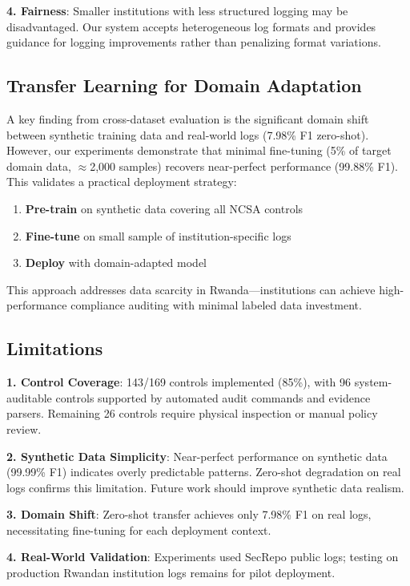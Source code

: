 \documentclass[11pt,conference]{IEEEtran}
\begin{document}
\textbf{4. Fairness}: Smaller institutions with less structured logging may be disadvantaged. Our system accepts heterogeneous log formats and provides guidance for logging improvements rather than penalizing format variations.

\subsection{Transfer Learning for Domain Adaptation}

A key finding from cross-dataset evaluation is the significant domain shift between synthetic training data and real-world logs (7.98\% F1 zero-shot). However, our experiments demonstrate that minimal fine-tuning (5\% of target domain data, $\approx$2,000 samples) recovers near-perfect performance (99.88\% F1). This validates a practical deployment strategy:

\begin{enumerate}
    \item \textbf{Pre-train} on synthetic data covering all NCSA controls
    \item \textbf{Fine-tune} on small sample of institution-specific logs
    \item \textbf{Deploy} with domain-adapted model
\end{enumerate}

This approach addresses data scarcity in Rwanda---institutions can achieve high-performance compliance auditing with minimal labeled data investment.

\subsection{Limitations}

\textbf{1. Control Coverage}: 143/169 controls implemented (85\%), with 96 system-auditable controls supported by automated audit commands and evidence parsers. Remaining 26 controls require physical inspection or manual policy review.

\textbf{2. Synthetic Data Simplicity}: Near-perfect performance on synthetic data (99.99\% F1) indicates overly predictable patterns. Zero-shot degradation on real logs confirms this limitation. Future work should improve synthetic data realism.

\textbf{3. Domain Shift}: Zero-shot transfer achieves only 7.98\% F1 on real logs, necessitating fine-tuning for each deployment context.

\textbf{4. Real-World Validation}: Experiments used SecRepo public logs; testing on production Rwandan institution logs remains for pilot deployment.
\end{document}
